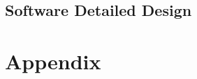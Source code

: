 \documentclass[11pt,a4paper]{article}
\begin{document}
\subsection{Software Detailed Design}

\appendix
\section{Appendix}
\end{document}
